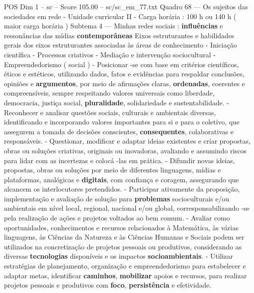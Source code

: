 \begin{textsample}{POS Dim 1 – sc – Score 105.00 – sc/sc\_em\_77.txt}
Quadro 68 — Os sujeitos das sociedades em rede - Unidade curricular II - Carga horária : 100 h ou 140 h ( maior carga horária ) Subtema 4 — Minhas redes sociais : \textbf{influências} e ressonâncias das mídias \textbf{contemporâneas} Eixos estruturantes e habilidades gerais dos eixos estruturantes associadas às áreas de conhecimento - Iniciação científica - Processos criativos - Mediação e intervenção sociocultural - Empreendedorismo ( social ) - Posicionar -se com base em critérios científicos, éticos e estéticos, utilizando dados, fatos e evidências para respaldar conclusões, opiniões e \textbf{argumentos}, por meio de afirmações claras, \textbf{ordenadas}, coerentes e compreensíveis, sempre respeitando valores universais como liberdade, democracia, justiça social, \textbf{pluralidade}, solidariedade e sustentabilidade. - Reconhecer e analisar questões sociais, culturais e ambientais diversas, identificando e incorporando valores importantes para si e para o coletivo, que assegurem a tomada de decisões conscientes, \textbf{consequentes}, colaborativas e responsáveis. - Questionar, modificar e adaptar ideias existentes e criar propostas, obras ou soluções criativas, originais ou inovadoras, avaliando e assumindo riscos para lidar com as incertezas e colocá -las em prática. - Difundir novas ideias, propostas, obras ou soluções por meio de diferentes linguagens, mídias e plataformas, analógicas e \textbf{digitais}, com confiança e coragem, assegurando que alcancem os interlocutores pretendidos. - Participar ativamente da proposição, implementação e avaliação de solução para \textbf{problemas} socioculturais e/ou ambientais em nível local, regional, nacional e/ou global, corresponsabilizando -se pela realização de ações e projetos voltados ao bem comum. - Avaliar como oportunidades, conhecimentos e recursos relacionados à Matemática, às várias linguagens, às Ciências da Natureza e às Ciências Humanas e Sociais podem ser utilizados na concretização de projetos pessoais ou produtivos, considerando as diversas \textbf{tecnologias} disponíveis e os impactos \textbf{socioambientais}. - Utilizar estratégias de planejamento, organização e empreendedorismo para estabelecer e adaptar metas, identificar \textbf{caminhos}, \textbf{mobilizar} apoios e recursos, para realizar projetos pessoais e produtivos com \textbf{foco}, \textbf{persistência} e efetividade.

\end{textsample}
